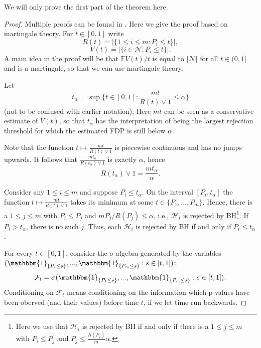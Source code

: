 \documentclass[11pt]{article}
\theoremstyle{plain}
\theoremstyle{definition}
\newcommand{\N}{\mathcal{N}}
\newcommand{\Hy}{\mathcal{H}}
\newcommand{\citt}{\citet}
\begin{document}
We will only prove the first part of the theorem here.
\begin{proof}
Multiple proofs can be found in \citt{wang2022elementary}. Here we give the proof based on martingale theory.
For $t\in[0,1]$ write 
$$R(t)= |\{1\leq i \leq m: P_i\leq t\}|,$$ 
$$V(t)= |\{i\in \N: P_i\leq t\}|.$$ 
A main idea in the proof will be  that $\mathbb{E}V(t)/t$ is equal to $|\N|$ for all $t\in (0,1]$
and is a martingale, so that we can use martingale theory.

Let $$t_{\alpha} = \sup\{t\in [0,1]: \frac{mt}{R(t)\vee 1}\leq \alpha\}$$ (not to be confused with earlier notation). Here $mt$ can be seen as a conservative estimate of $V(t)$, so that $t_{\alpha}$ has the interpretation of being the largest rejection threshold for which the estimated FDP is still below $\alpha$.

Note that the function $t\mapsto \frac{mt}{R(t)\vee 1}$ is piecewise continuous and has no jumps upwards. It follows that  $\frac{mt_{\alpha}}{R(t_{\alpha})\vee 1}$ is exactly $\alpha$, hence
\begin{equation} \label{eqR}
R(t_{\alpha})\vee 1 = \frac{mt_{\alpha}}{\alpha}.
\end{equation}

Consider any $1\leq i \leq m$ and suppose $P_i\leq t_{\alpha}$. On the interval $[P_i, t_\alpha]$ the function $t\mapsto \frac{mt}{R(t)\vee 1}$ takes its minimum at some $t\in\{P_1,...,P_m\}$.
Hence, there is a $1\leq j\leq m$ with $P_i\leq P_j$ and $mP_{j}/R(P_j)\leq \alpha$, i.e.,  $\Hy_i$ is rejected by BH\footnote{Here we use that $\Hy_i$ is rejected by BH if and only if   there is a $1\leq j\leq m$ with $P_i\leq P_j$ and $P_j\leq \frac{R(P_j)}{m}\alpha$.}.
If $P_i> t_{\alpha}$, there is no such $j$. Thus, each $\Hy_i$ is rejected by BH if and only if $P_i\leq t_{\alpha}$. %

For every $t\in[0,1]$, consider the $\sigma$-algebra generated by the variables $(\mathbbm{1}_{\{P_1\leq s\}},...,\mathbbm{1}_{\{P_m\leq s\}}:s\in [t,1])$:
$$\mathcal{F}_t = \sigma(\mathbbm{1}_{\{P_1\leq s\}},...,\mathbbm{1}_{\{P_m\leq s\}}:s\in [t,1]).$$
Conditioning on $\mathcal{F}_t$ means conditioning on the information which p-values have been oberved (and their values) before time $t$, if we let time run backwards.


\end{proof}
\end{document}
